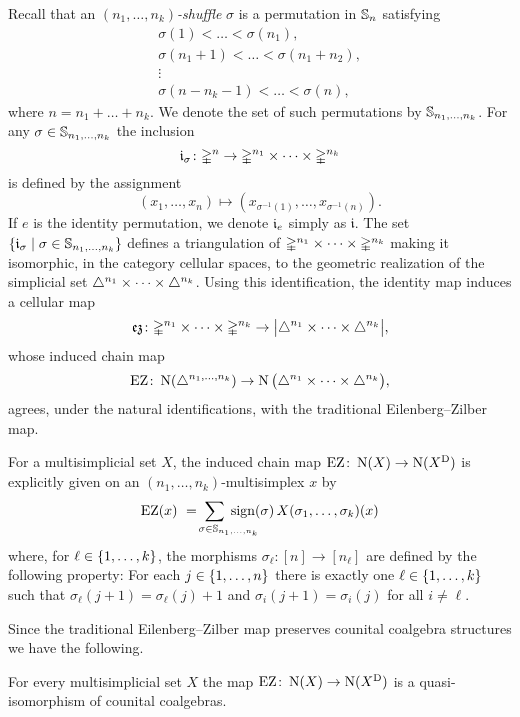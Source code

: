 Recall that an \textit{$(n_1,\dots,n_k)$-shuffle} $\sigma$ is a permutation in $\sym_n$ satisfying
\begin{gather*}
	\sigma(1) < \dots < \sigma(n_1), \\
	\sigma(n_1+1) < \dots < \sigma(n_1+n_2), \\
	\vdots \\
	\sigma(n-n_k-1) < \dots < \sigma(n),
\end{gather*}
where $n = n_1+\dots+n_k$.
We denote the set of such permutations by $\sh_{n_1,\dots,n_k}$.
For any $\sigma \in \sh_{n_1,\dots,n_k}$ the inclusion
\[
\gi_\sigma \colon \gsimplex^n \to \gmsimplex{n_1}{n_k}
\]
is defined by the assignment
\[
(x_1,\dots,x_n) \mapsto (x_{\sigma^{-1}(1)}, \dots, x_{\sigma^{-1}(n)}).
\]
If $e$ is the identity permutation, we denote $\gi_{e}$ simply as $\mathfrak{i}$.
The set $\set{\gi_\sigma \mid \sigma \in \sh_{n_1,\dots,n_k}}$ defines a triangulation of $\gmsimplex{n_1}{n_k}$ making it isomorphic, in the category cellular spaces, to the geometric realization of the simplicial set $\msimplex{n_1}{n_k}$.
Using this identification, the identity map induces a cellular map
\[
\ez \colon \gmsimplex{n_1}{n_k} \to \bars[\big]{\msimplex{n_1}{n_k}},
\]
whose induced chain map
\[
\EZ \colon \chains(\simplex^{n_1,\dots,n_k}) \to \chains\big(\msimplex{n_1}{n_k}\big),
\]
agrees, under the natural identifications, with the traditional Eilenberg--Zilber map.

For a multisimplicial set $X$, the induced chain map $\EZ \colon \chains(X) \to \chains(X^\diag)$ is explicitly given on an $(n_1,\dots,n_k)$-multisimplex $x$ by
\[
\EZ(x) \ = \sum_{\qquad \crampedclap{\sigma \in \sh_{n_1,\dots,n_k}}} \sign(\sigma) \, X(\sigma_1 ,\dots, \sigma_k)(x)
\]
where, for $\ell \in \set{1,\dots,k}$, the morphisms $\sigma_\ell \colon [n] \to [n_\ell]$ are defined by the following property: For
each $j \in \set{1,\dots,n}$ there is exactly one $\ell \in \set{1,\dots,k}$ such that $\sigma_\ell(j+1) = \sigma_\ell(j)+1$ and $\sigma_i(j+1) = \sigma_i(j)$ for all $i \neq \ell$.

Since the traditional Eilenberg--Zilber map preserves counital coalgebra structures we have the following.

\begin{theorem*}
	For every multisimplicial set $X$ the map $\EZ \colon \chains(X) \to \chains(X^\diag)$ is a quasi-isomorphism of counital coalgebras.
\end{theorem*}

